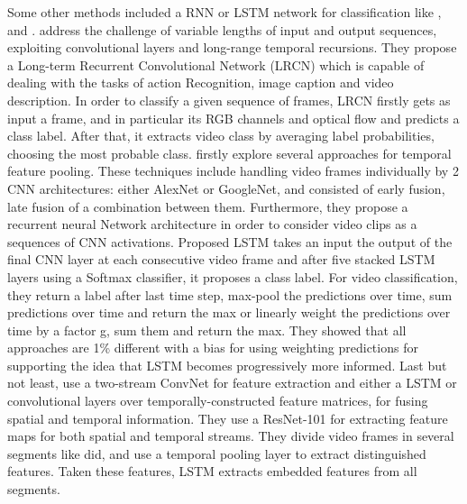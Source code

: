 Some other methods included a RNN or LSTM network for classification like \cite{DBLP:journals/corr/DonahueHGRVSD14}, \cite{DBLP:journals/corr/NgHVVMT15} and \cite{DBLP:journals/corr/MaCKA17}.  \cite{DBLP:journals/corr/DonahueHGRVSD14} address the challenge of variable lengths of
input and output sequences, exploiting convolutional layers and long-range temporal recursions. They propose a Long-term Recurrent
Convolutional Network (LRCN) which is capable of dealing with the tasks of action Recognition, image caption and video description. In order to classify a given sequence of frames, LRCN firstly gets as input a frame, and in particular its RGB channels and optical flow and predicts a class label. After that, it extracts video class by averaging label probabilities, choosing the most probable class.
\cite{DBLP:journals/corr/NgHVVMT15} firstly explore several approaches for temporal feature pooling. These techniques include handling video
frames individually by 2 CNN architectures: either AlexNet or GoogleNet, and consisted of early fusion, late fusion of a combination between
them. Furthermore, they propose a recurrent neural Network architecture in order to consider video clips as a sequences of CNN activations.
Proposed LSTM takes an input the output of the final CNN layer at each consecutive video frame and after five stacked LSTM layers using a
Softmax classifier, it proposes a class label. For video classification, they return a label after last time step, max-pool the predictions
over time, sum predictions over time and return the max or linearly weight the predictions over time by a factor g, sum them and return the max.
They showed that all approaches are 1\% different with a bias for using weighting predictions for supporting the idea that LSTM becomes progressively more informed. Last but not least,  \cite{DBLP:journals/corr/MaCKA17} use a two-stream ConvNet for feature extraction and either a LSTM or convolutional layers over temporally-constructed feature matrices, for fusing spatial and temporal information. They use a ResNet-101 for
extracting feature maps for both spatial and temporal streams. They divide video frames in several segments like \cite{DBLP:journals/corr/WangXW0LTG16} did, and use a temporal pooling layer to extract distinguished features. Taken these features, LSTM extracts embedded features from all segments.\par

